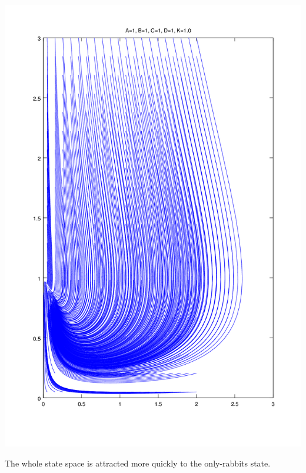\documentclass{article}
\begin{document}
\includegraphics[width=\textwidth]{plots/phase-potrait-degenerate.png}

The whole state space is attracted more quickly to the only-rabbits
	state.
\end{document}
